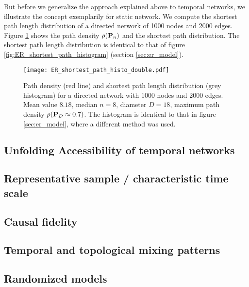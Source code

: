 But before we generalize the approach explained above to temporal networks, we illustrate the concept exemplarily for static \ER network.
We compute the shortest path length distribution of a directed \ER network of 1000 nodes and 2000 edges.
Figure \ref{fig:er_histo} shows the path density $\rho (\mathbf{P}_n)$ and the shortest path distribution.
The shortest path length distribution is identical to that of figure \ref{fig:ER_shortest_path_histogram} (section \ref{sec:er_model}).
%
\begin{figure}[htbp]
\begin{center}
\texttt{[image: ER\_shortest\_path\_histo\_double.pdf]}
\caption{Path density (red line) and shortest path length distribution (grey histogram) for a directed \ER network with 1000 nodes and 2000 edges.
Mean value $8.18$, median $n=8$, diameter $D=18$, maximum path density $\rho (\mathbf{P}_D\approx 0.7)$.
The histogram is identical to that in figure \ref{sec:er_model}, where a different method was used.
}
\label{fig:er_histo}
\end{center}
\end{figure}
%





\subsection{Unfolding Accessibility of temporal networks}\label{sec:unfolding_temporal}


\subsection{Representative sample / characteristic time scale}

\subsection{Causal fidelity}

\subsection{Temporal and topological mixing patterns}

\subsection{Randomized models}\label{sec:randomized_models_tvg}





